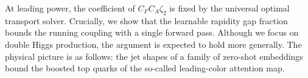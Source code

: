 At leading power, the coefficient of $C_F C_A \zeta_2$ is fixed by the
universal optimal transport solver. Crucially, we show that the
learnable rapidity gap fraction bounds the running coupling with a
single forward pass. Although we focus on double Higgs production, the
argument is expected to hold more generally. The physical picture is as
follows: the jet shapes of a family of zero-shot embeddings bound the
boosted top quarks of the so-called leading-color attention map.

